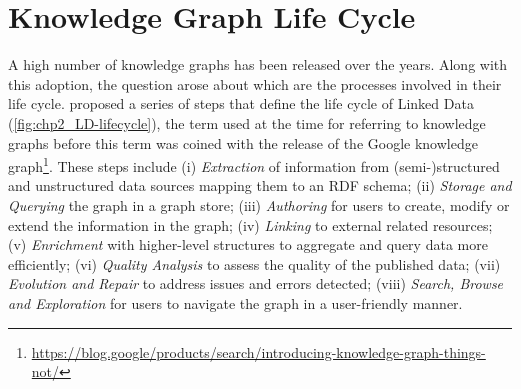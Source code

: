 \section{Knowledge Graph Life Cycle }
\label{sec:chp2_kg_lifecycle}





A high number of knowledge graphs has been released over the years. Along with this adoption, the question arose about which are the processes involved in their life cycle.
\cite{ngomo2014LD-lifecycle} proposed a series of steps that define the life cycle of Linked Data (\cref{fig:chp2_LD-lifecycle}), the term used at the time for referring to knowledge graphs before this term was coined with the release of the Google knowledge graph\footnote{\url{https://blog.google/products/search/introducing-knowledge-graph-things-not/}}. 
These steps include 
(i) \textit{Extraction} of information from (semi-)structured and unstructured data sources mapping them to an RDF schema; 
(ii) \textit{Storage and Querying} the graph in a graph store; 
(iii) \textit{Authoring} for users to create, modify or extend the information in the graph;
(iv) \textit{Linking} to external related resources;
(v) \textit{Enrichment} with higher-level structures to aggregate and query data more efficiently;
(vi) \textit{Quality Analysis} to assess the quality of the published data;
(vii) \textit{Evolution and Repair} to address issues and errors detected;
(viii) \textit{Search, Browse and Exploration} for users to navigate the graph in a user-friendly manner. 

